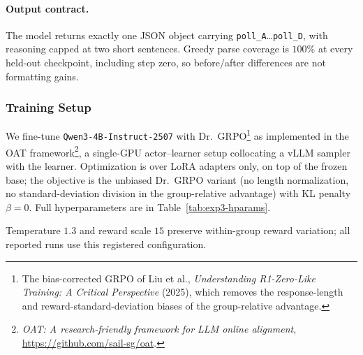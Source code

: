 \paragraph{Output contract.} The model returns exactly one JSON object carrying
\texttt{poll\_A}\dots\texttt{poll\_D}, with reasoning capped at two short
sentences. Greedy parse coverage is $100\%$ at every held-out checkpoint,
including step zero, so before/after differences are not formatting gains.

\subsubsection{Training Setup}
\label{app:exp3-train}

We fine-tune \texttt{Qwen3-4B-Instruct-2507} with Dr.\ GRPO\footnote{The bias-corrected GRPO of Liu et
al., \emph{Understanding R1-Zero-Like Training: A Critical Perspective} (2025), which removes the
response-length and reward-standard-deviation biases of the group-relative advantage.} as implemented in
the OAT framework\footnote{\emph{OAT: A research-friendly framework for LLM online alignment},
\url{https://github.com/sail-sg/oat}.}, a single-GPU actor--learner setup collocating a vLLM sampler with
the learner. Optimization is over LoRA adapters only, on top of the frozen base; the objective is the
unbiased Dr.\ GRPO variant (no length normalization, no standard-deviation division in the group-relative
advantage) with KL penalty $\beta{=}0$. Full hyperparameters are in Table~\ref{tab:exp3-hparams}.

Temperature $1.3$ and reward scale $15$ preserve within-group reward variation;
all reported runs use this registered configuration.

